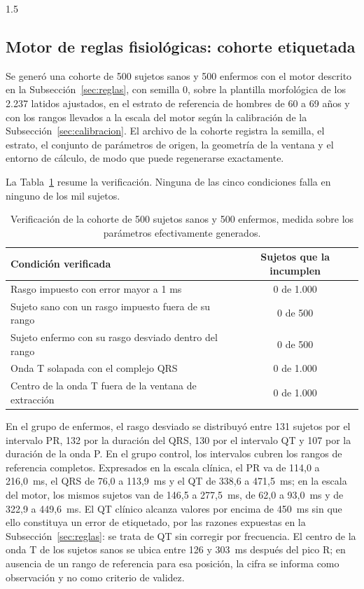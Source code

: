 \begin{spacing}{1.5}
\subsection{Motor de reglas fisiológicas: cohorte etiquetada}\label{sec:cohorte}

Se generó una cohorte de 500 sujetos sanos y 500 enfermos con el motor descrito en la Subsección~\ref{sec:reglas}, con semilla 0, sobre la plantilla morfológica de los 2.237 latidos ajustados, en el estrato de referencia de hombres de 60 a 69 años y con los rangos llevados a la escala del motor según la calibración de la Subsección~\ref{sec:calibracion}. El archivo de la cohorte registra la semilla, el estrato, el conjunto de parámetros de origen, la geometría de la ventana y el entorno de cálculo, de modo que puede regenerarse exactamente.

La Tabla~\ref{tab:cohorte} resume la verificación. Ninguna de las cinco condiciones falla en ninguno de los mil sujetos.

\begin{table}[H]
\centering
\begin{tabular}{|p{9cm}|c|}
\hline
\textbf{Condición verificada} & \textbf{Sujetos que la incumplen} \\ \hline
Rasgo impuesto con error mayor a 1 ms & 0 de 1.000 \\ \hline
Sujeto sano con un rasgo impuesto fuera de su rango & 0 de 500 \\ \hline
Sujeto enfermo con su rasgo desviado dentro del rango & 0 de 500 \\ \hline
Onda T solapada con el complejo QRS & 0 de 1.000 \\ \hline
Centro de la onda T fuera de la ventana de extracción & 0 de 1.000 \\ \hline
\end{tabular}
\caption{Verificación de la cohorte de 500 sujetos sanos y 500 enfermos, medida sobre los parámetros efectivamente generados.}
\label{tab:cohorte}
\end{table}

En el grupo de enfermos, el rasgo desviado se distribuyó entre 131 sujetos por el intervalo PR, 132 por la duración del QRS, 130 por el intervalo QT y 107 por la duración de la onda P. En el grupo control, los intervalos cubren los rangos de referencia completos. Expresados en la escala clínica, el PR va de 114,0 a 216,0~ms, el QRS de 76,0 a 113,9~ms y el QT de 338,6 a 471,5~ms; en la escala del motor, los mismos sujetos van de 146,5 a 277,5~ms, de 62,0 a 93,0~ms y de 322,9 a 449,6~ms. El QT clínico alcanza valores por encima de 450~ms sin que ello constituya un error de etiquetado, por las razones expuestas en la Subsección~\ref{sec:reglas}: se trata de QT sin corregir por frecuencia. El centro de la onda T de los sujetos sanos se ubica entre 126 y 303~ms después del pico R; en ausencia de un rango de referencia para esa posición, la cifra se informa como observación y no como criterio de validez.


\end{spacing}
